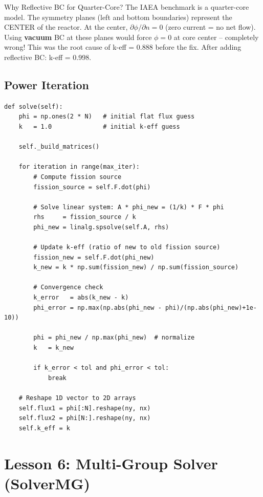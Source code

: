 \documentclass[12pt,a4paper]{article}
\begin{document}
\begin{lessonbox}{Why Reflective BC for Quarter-Core?}
The IAEA benchmark is a quarter-core model. The symmetry planes (left and
bottom boundaries) represent the CENTER of the reactor.
At the center, $\partial\phi/\partial n = 0$ (zero current = no net flow).
Using \textbf{vacuum} BC at these planes would force $\phi=0$ at core center
-- completely wrong! This was the root cause of k-eff = 0.888 before the fix.
After adding reflective BC: k-eff = 0.998.
\end{lessonbox}

\subsection{Power Iteration}

\begin{lstlisting}[caption={Power Iteration -- Eigenvalue Solver}]
def solve(self):
    phi = np.ones(2 * N)   # initial flat flux guess
    k   = 1.0              # initial k-eff guess

    self._build_matrices()

    for iteration in range(max_iter):
        # Compute fission source
        fission_source = self.F.dot(phi)

        # Solve linear system: A * phi_new = (1/k) * F * phi
        rhs     = fission_source / k
        phi_new = linalg.spsolve(self.A, rhs)

        # Update k-eff (ratio of new to old fission source)
        fission_new = self.F.dot(phi_new)
        k_new = k * np.sum(fission_new) / np.sum(fission_source)

        # Convergence check
        k_error   = abs(k_new - k)
        phi_error = np.max(np.abs(phi_new - phi)/(np.abs(phi_new)+1e-10))

        phi = phi_new / np.max(phi_new)  # normalize
        k   = k_new

        if k_error < tol and phi_error < tol:
            break

    # Reshape 1D vector to 2D arrays
    self.flux1 = phi[:N].reshape(ny, nx)
    self.flux2 = phi[N:].reshape(ny, nx)
    self.k_eff = k
\end{lstlisting}

\section{Lesson 6: Multi-Group Solver (SolverMG)}
\end{document}
